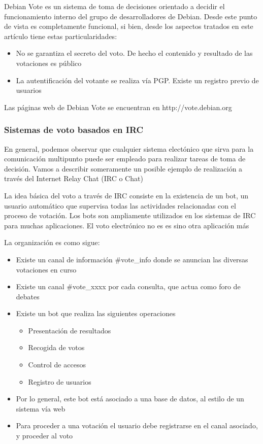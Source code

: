 Debian Vote es un sistema de toma de decisiones orientado a decidir el funcionamiento interno del grupo de desarrolladores de Debian. Desde este punto de vista es completamente funcional, si bien, desde los aspectos tratados en este artículo tiene estas particularidades:

\begin{itemize}
\item No se garantiza el secreto del voto. De hecho el contenido y resultado de las votaciones es público
\item La autentificación del votante se realiza vía PGP. Existe un registro previo de usuarios

\end{itemize}

Las páginas web de Debian Vote se encuentran en http://vote.debian.org


\subsubsection*{Sistemas de voto basados en IRC}
En general, podemos observar que cualquier sistema electónico que sirva para la comunicación multipunto puede ser empleado para realizar tareas de toma de decisión. Vamos a describir someramente un posible ejemplo de realización a través del Internet Relay Chat (IRC o Chat)

La idea básica del voto a través de IRC consiste en la existencia de un bot, un usuario automático que supervisa todas las actividades relacionadas con el proceso de votación. Los bots son ampliamente utilizados en los sistemas de IRC para muchas aplicaciones. El voto electrónico no es es sino otra aplicación más

La organización es como sigue:

\begin{itemize}

\item Existe un canal de información \#vote\_info donde se anuncian las diversas votaciones en curso
\item Existe un canal \#vote\_xxxx por cada consulta,  que actua como foro de debates
\item Existe un bot que realiza las siguientes operaciones
	\begin{itemize}
	\item Presentación de resultados
	\item Recogida de votos
	\item Control de accesos
	\item Registro de usuarios
	\end{itemize}
\item Por lo general, este bot está asociado a una base de datos, al estilo de un sistema vía web
\item Para proceder a una votación el usuario debe registrarse en el canal asociado, y proceder al voto
\end{itemize}


